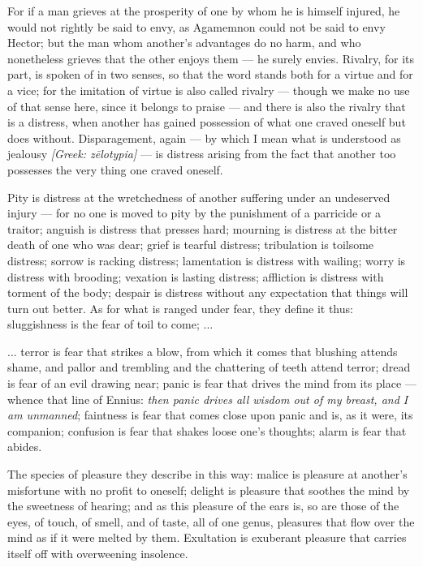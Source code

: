  For if a man grieves at the prosperity of one by whom he is himself injured, he would not rightly be said to envy, as Agamemnon could not be said to envy Hector; but the man whom another's advantages do no harm, and who nonetheless grieves that the other enjoys them — he surely envies. Rivalry, for its part, is spoken of in two senses, so that the word stands both for a virtue and for a vice; for the imitation of virtue is also called rivalry — though we make no use of that sense here, since it belongs to praise — and there is also the rivalry that is a distress, when another has gained possession of what one craved oneself but does without. Disparagement, again — by which I mean what is understood as jealousy \textit{[Greek: zēlotypia]} — is distress arising from the fact that another too possesses the very thing one craved oneself.

 Pity is distress at the wretchedness of another suffering under an undeserved injury — for no one is moved to pity by the punishment of a parricide or a traitor; anguish is distress that presses hard; mourning is distress at the bitter death of one who was dear; grief is tearful distress; tribulation is toilsome distress; sorrow is racking distress; lamentation is distress with wailing; worry is distress with brooding; vexation is lasting distress; affliction is distress with torment of the body; despair is distress without any expectation that things will turn out better. As for what is ranged under fear, they define it thus: sluggishness is the fear of toil to come; ...

 ... terror is fear that strikes a blow, from which it comes that blushing attends shame, and pallor and trembling and the chattering of teeth attend terror; dread is fear of an evil drawing near; panic is fear that drives the mind from its place — whence that line of Ennius: \textit{then panic drives all wisdom out of my breast, and I am unmanned}; faintness is fear that comes close upon panic and is, as it were, its companion; confusion is fear that shakes loose one's thoughts; alarm is fear that abides.

 The species of pleasure they describe in this way: malice is pleasure at another's misfortune with no profit to oneself; delight is pleasure that soothes the mind by the sweetness of hearing; and as this pleasure of the ears is, so are those of the eyes, of touch, of smell, and of taste, all of one genus, pleasures that flow over the mind as if it were melted by them. Exultation is exuberant pleasure that carries itself off with overweening insolence.

